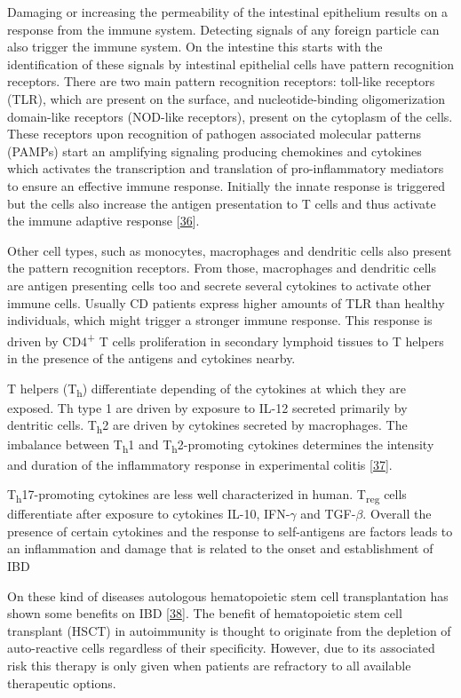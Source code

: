 \documentclass[
  12pt,
  a4paper,
  twoside,
  openright]{book}
\begin{document}
Damaging or increasing the permeability of the intestinal epithelium results on a response from the immune system.
Detecting signals of any foreign particle can also trigger the immune system.
On the intestine this starts with the identification of these signals by intestinal epithelial cells have pattern recognition receptors.
There are two main pattern recognition receptors: toll-like receptors (TLR), which are present on the surface, and nucleotide-binding oligomerization domain-like receptors (NOD-like receptors), present on the cytoplasm of the cells.
These receptors upon recognition of pathogen associated molecular patterns (PAMPs) start an amplifying signaling producing chemokines and cytokines which activates the transcription and translation of pro-inflammatory mediators to ensure an effective immune response.
Initially the innate response is triggered but the cells also increase the antigen presentation to T cells and thus activate the immune adaptive response {[}\protect\hyperlink{ref-mayorgas2021a}{36}{]}.

Other cell types, such as monocytes, macrophages and dendritic cells also present the pattern recognition receptors.
From those, macrophages and dendritic cells are antigen presenting cells too and secrete several cytokines to activate other immune cells.
Usually CD patients express higher amounts of TLR than healthy individuals, which might trigger a stronger immune response.
This response is driven by CD4\textsuperscript{+} T cells proliferation in secondary lymphoid tissues to T helpers in the presence of the antigens and cytokines nearby.

T helpers (T\textsubscript{h}) differentiate depending of the cytokines at which they are exposed.
Th type 1 are driven by exposure to IL-12 secreted primarily by dentritic cells.
T\textsubscript{h}2 are driven by cytokines secreted by macrophages.
The imbalance between T\textsubscript{h}1 and T\textsubscript{h}2-promoting cytokines determines the intensity and duration of the inflammatory response in experimental colitis {[}\protect\hyperlink{ref-neurath1996}{37}{]}.

T\textsubscript{h}17-promoting cytokines are less well characterized in human.
T\textsubscript{reg} cells differentiate after exposure to cytokines IL-10, IFN-\(\gamma\) and TGF-\(\beta\).
Overall the presence of certain cytokines and the response to self-antigens are factors leads to an inflammation and damage that is related to the onset and establishment of IBD

On these kind of diseases autologous hematopoietic stem cell transplantation has shown some benefits on IBD {[}\protect\hyperlink{ref-corraliza}{38}{]}.
The benefit of hematopoietic stem cell transplant (HSCT) in autoimmunity is thought to originate from the depletion of auto-reactive cells regardless of their specificity.
However, due to its associated risk this therapy is only given when patients are refractory to all available therapeutic options.
\end{document}
